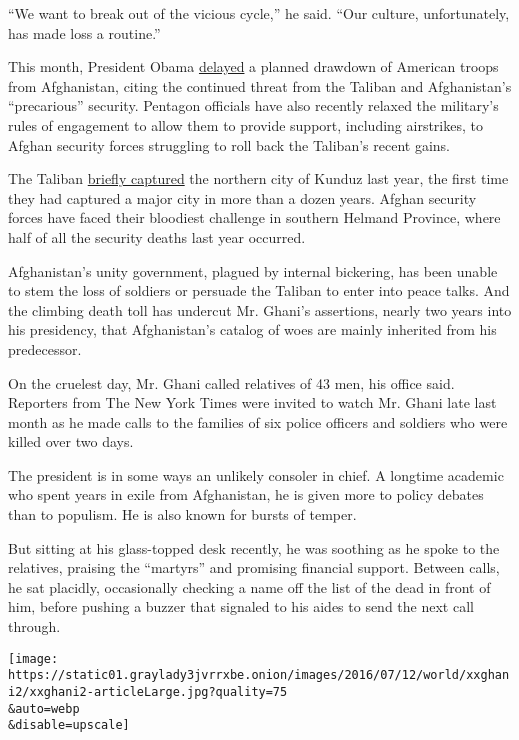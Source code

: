 ``We want to break out of the vicious cycle,'' he said. ``Our culture,
unfortunately, has made loss a routine.''

This month, President Obama
\href{http://www.nytimes3xbfgragh.onion/2016/07/07/world/asia/obama-afghanistan-troops.html}{delayed}
a planned drawdown of American troops from Afghanistan, citing the
continued threat from the Taliban and Afghanistan's ``precarious''
security. Pentagon officials have also recently relaxed the military's
rules of engagement to allow them to provide support, including
airstrikes, to Afghan security forces struggling to roll back the
Taliban's recent gains.

The Taliban
\href{http://www.nytimes3xbfgragh.onion/2015/10/14/world/asia/taliban-afghanistan-kunduz.html}{briefly
captured} the northern city of Kunduz last year, the first time they had
captured a major city in more than a dozen years. Afghan security forces
have faced their bloodiest challenge in southern Helmand Province, where
half of all the security deaths last year occurred.

Afghanistan's unity government, plagued by internal bickering, has been
unable to stem the loss of soldiers or persuade the Taliban to enter
into peace talks. And the climbing death toll has undercut Mr. Ghani's
assertions, nearly two years into his presidency, that Afghanistan's
catalog of woes are mainly inherited from his predecessor.

On the cruelest day, Mr. Ghani called relatives of 43 men, his office
said. Reporters from The New York Times were invited to watch Mr. Ghani
late last month as he made calls to the families of six police officers
and soldiers who were killed over two days.

The president is in some ways an unlikely consoler in chief. A longtime
academic who spent years in exile from Afghanistan, he is given more to
policy debates than to populism. He is also known for bursts of temper.

But sitting at his glass-topped desk recently, he was soothing as he
spoke to the relatives, praising the ``martyrs'' and promising financial
support. Between calls, he sat placidly, occasionally checking a name
off the list of the dead in front of him, before pushing a buzzer that
signaled to his aides to send the next call through.

\texttt{[image: https://static01.graylady3jvrrxbe.onion/images/2016/07/12/world/xxghani2/xxghani2-articleLarge.jpg?quality=75\\\&auto=webp\\\&disable=upscale]}

